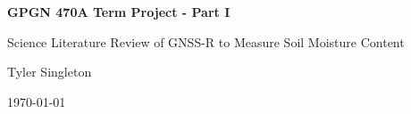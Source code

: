 \begin{center}
    \large
    \textbf{GPGN 470A Term Project - Part I}
    
    \vspace{0.4cm}
    \large
    Science Literature Review of GNSS-R to Measure Soil Moisture Content
    
    \vspace{0.4cm}
    Tyler Singleton
    
    \vspace{0.4cm}
    \today
    
    \vspace{0.9cm}
\end{center}